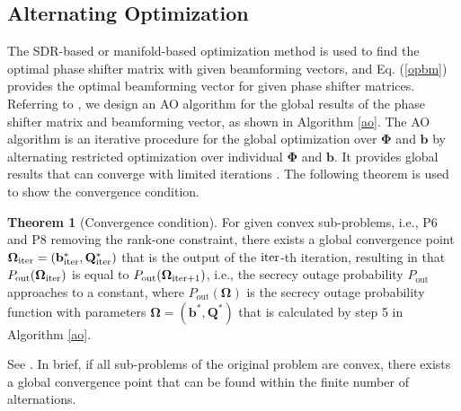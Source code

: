 \documentclass[journal]{IEEEtran}
\theoremstyle{definition}
\newtheorem{theorem}{Theorem}
\begin{document}
\subsection{Alternating Optimization}
The SDR-based or manifold-based optimization method is used to find the optimal phase shifter matrix with given beamforming vectors, and Eq. (\ref{opbm}) provides the optimal beamforming vector for given phase shifter matrices. Referring to \cite{Huang2019}, we design an  AO algorithm for the global results of the phase shifter matrix and beamforming vector, as shown in Algorithm \ref{ao}. The AO algorithm is an iterative procedure for the global optimization over $\bm{\Phi}$ and $\mathbf{b}$ by alternating restricted optimization over individual $\bm{\Phi}$ and $\mathbf{b}$. It provides global results that can converge with limited iterations \cite{bezdek2003convergence}. The following theorem is used to show the convergence condition.


\begin{theorem}[Convergence condition]\label{cc}
For given convex sub-problems, i.e., P6 and P8 removing the rank-one constraint, there exists a global convergence point $\bm{\Omega}_{\rm{iter}}=(\mathbf{b}^*_{\rm{iter}}, \mathbf{Q}^*_{\rm{iter}})$ that is the output of the $\rm{iter}$-th iteration, resulting in that $P_{\text{out}}(\bm{\Omega}_{\rm{iter}})$ is equal to $P_{\text{out}}(\bm{\Omega}_{\rm{iter}+1})$, i.e., the secrecy outage probability $P_{\text{out}}$ approaches to a constant, where $P_{\text{out}}(\bm{\Omega})$ is the secrecy outage probability function with parameters $\bm{\Omega}=(\mathbf{b}^*,\mathbf{Q}^*)$ that is calculated by step 5 in Algorithm \ref{ao}.

\end{theorem}



\begin{IEEEproof}
See \cite[Th. 3]{bezdek2003convergence}. In brief, if all sub-problems of the original problem are convex, there exists a global convergence point that can be found within the finite number of alternations.
\end{IEEEproof}
\end{document}
